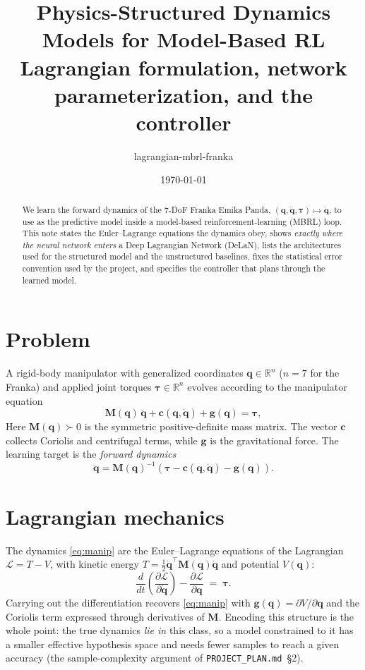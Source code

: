 \documentclass[11pt]{article}
\title{Physics-Structured Dynamics Models for Model-Based RL\\
\large Lagrangian formulation, network parameterization, and the controller}
\author{lagrangian-mbrl-franka}
\date{\today}
\newcommand{\q}{\bm{q}}
\newcommand{\qd}{\dot{\bm{q}}}
\newcommand{\qdd}{\ddot{\bm{q}}}
\newcommand{\R}{\mathbb{R}}
\newcommand{\M}{\bm{M}}
\begin{document}
\maketitle

\begin{abstract}
We learn the forward dynamics of the 7-DoF Franka Emika Panda,
$(\q,\qd,\bm{\tau})\mapsto\qdd$, to use as the predictive model inside a
model-based reinforcement-learning (MBRL) loop. This note states the
Euler--Lagrange equations the dynamics obey, shows \emph{exactly where the
neural network enters} a Deep Lagrangian Network (DeLaN), lists the architectures
used for the structured model and the unstructured baselines, fixes the
statistical error convention used by the project, and specifies the controller
that plans through the learned model.
\end{abstract}

\section{Problem}
A rigid-body manipulator with generalized coordinates $\q\in\R^{n}$
($n=7$ for the Franka) and applied joint torques $\bm{\tau}\in\R^{n}$ evolves
according to the manipulator equation
\begin{equation}
\M(\q)\,\qdd + \bm{c}(\q,\qd) + \bm{g}(\q) = \bm{\tau},
\label{eq:manip}
\end{equation}
Here $\M(\q)\succ0$ is the symmetric positive-definite mass matrix.
The vector $\bm{c}$ collects Coriolis and centrifugal terms, while $\bm{g}$ is
the gravitational force. The learning target is the \emph{forward dynamics}
\begin{equation}
\qdd = \M(\q)^{-1}\!\left(\bm{\tau}-\bm{c}(\q,\qd)-\bm{g}(\q)\right).
\label{eq:fwd}
\end{equation}

\section{Lagrangian mechanics}
The dynamics \eqref{eq:manip} are the Euler--Lagrange equations of the Lagrangian
$\mathcal{L}=T-V$, with kinetic energy $T=\tfrac12\qd^{\top}\M(\q)\qd$ and
potential $V(\q)$:
\begin{equation}
\frac{d}{dt}\!\left(\frac{\partial \mathcal{L}}{\partial \qd}\right)
-\frac{\partial \mathcal{L}}{\partial \q} \;=\; \bm{\tau}.
\label{eq:el}
\end{equation}
Carrying out the differentiation recovers \eqref{eq:manip} with
$\bm{g}(\q)=\partial V/\partial\q$ and the Coriolis term expressed through
derivatives of $\M$. Encoding this structure is the whole point: the true
dynamics \emph{lie in} this class, so a model constrained to it has a smaller
effective hypothesis space and needs fewer samples to reach a given accuracy
(the sample-complexity argument of \texttt{PROJECT\_PLAN.md}~\S2).
\end{document}
